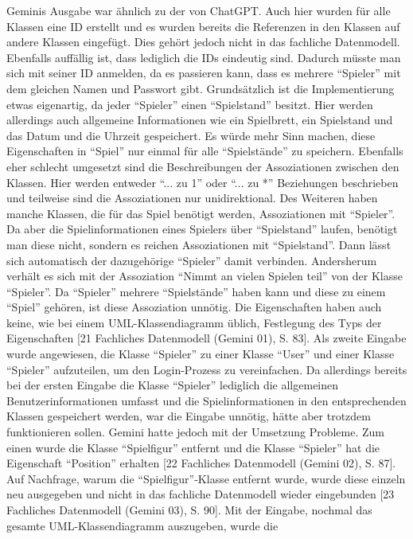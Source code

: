 Geminis Ausgabe war ähnlich zu der von ChatGPT. Auch hier wurden für alle Klassen eine ID erstellt und es wurden bereits die 
Referenzen in den Klassen auf andere Klassen eingefügt. Dies gehört jedoch nicht in das fachliche Datenmodell. Ebenfalls 
auffällig ist, dass lediglich die IDs eindeutig sind. Dadurch müsste man sich mit seiner ID anmelden, da es passieren 
kann, dass es mehrere ``Spieler'' mit dem gleichen Namen und Passwort gibt. Grundsätzlich ist die Implementierung etwas 
eigenartig, da jeder ``Spieler'' einen ``Spielstand'' besitzt. Hier werden allerdings auch allgemeine Informationen wie ein 
Spielbrett, ein Spielstand und das Datum und die Uhrzeit gespeichert. Es würde mehr Sinn machen, diese Eigenschaften in 
``Spiel'' nur einmal für alle ``Spielstände'' zu speichern. Ebenfalls eher schlecht umgesetzt sind die Beschreibungen der 
Assoziationen zwischen den Klassen. Hier werden entweder ``... zu 1'' oder ``... zu *'' Beziehungen beschrieben und teilweise 
sind die Assoziationen nur unidirektional. Des Weiteren haben manche Klassen, die für das Spiel benötigt werden, Assoziationen 
mit ``Spieler''. Da aber die Spielinformationen eines Spielers über ``Spielstand'' laufen, benötigt man diese nicht, sondern es 
reichen Assoziationen mit ``Spielstand''. Dann lässt sich automatisch der dazugehörige ``Spieler'' damit verbinden. Andersherum 
verhält es sich mit der Assoziation ``Nimmt an vielen Spielen teil'' von der Klasse ``Spieler''. Da ``Spieler'' mehrere ``Spielstände'' 
haben kann und diese zu einem ``Spiel'' gehören, ist diese Assoziation unnötig. Die Eigenschaften haben auch keine, wie bei einem 
UML-Klassendiagramm üblich, Festlegung des Typs der Eigenschaften [21 Fachliches Datenmodell (Gemini 01), S. 83]. Als zweite 
Eingabe wurde angewiesen, die Klasse ``Spieler'' zu einer Klasse ``User'' und einer Klasse ``Spieler'' aufzuteilen, um den Login-Prozess 
zu vereinfachen. Da allerdings bereits bei der ersten Eingabe die Klasse ``Spieler'' lediglich die allgemeinen Benutzerinformationen 
umfasst und die Spielinformationen in den entsprechenden Klassen gespeichert werden, war die Eingabe unnötig, hätte aber trotzdem 
funktionieren sollen. Gemini hatte jedoch mit der Umsetzung Probleme. Zum einen wurde die Klasse ``Spielfigur'' entfernt und die 
Klasse ``Spieler'' hat die Eigenschaft ``Position'' erhalten [22 Fachliches Datenmodell (Gemini 02), S. 87]. Auf Nachfrage, warum die 
``Spielfigur''-Klasse entfernt wurde, wurde diese einzeln neu ausgegeben und nicht in das fachliche Datenmodell wieder eingebunden 
[23 Fachliches Datenmodell (Gemini 03), S. 90]. Mit der Eingabe, nochmal das gesamte UML-Klassendiagramm auszugeben, wurde die 
